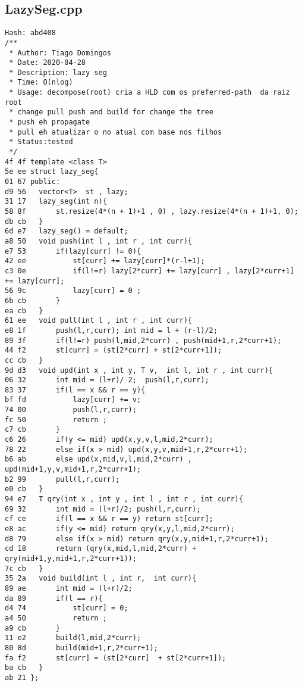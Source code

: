 \documentclass[11pt, a4paper, twoside]{article}
\begin{document}
\subsection{LazySeg.cpp}
\begin{lstlisting}
Hash: abd408
/**
 * Author: Tiago Domingos
 * Date: 2020-04-28
 * Description: lazy seg
 * Time: O(nlog) 
 * Usage: decompose(root) cria a HLD com os preferred-path  da raiz root
 * change pull push and build for change the tree 
 * push eh propagate
 * pull eh atualizar o no atual com base nos filhos
 * Status:tested 
 */
4f 4f template <class T> 
5e ee struct lazy_seg{
01 67 public:
d9 56 	vector<T>  st , lazy;
31 17 	lazy_seg(int n){
58 8f 		st.resize(4*(n + 1)+1 , 0) , lazy.resize(4*(n + 1)+1, 0);
db cb 	}
6d e7 	lazy_seg() = default;
a8 50 	void push(int l , int r , int curr){
e7 53 		if(lazy[curr] != 0){
42 ee 			st[curr] += lazy[curr]*(r-l+1);
c3 0e 			if(l!=r) lazy[2*curr] += lazy[curr] , lazy[2*curr+1] += lazy[curr];
56 9c 			lazy[curr] = 0 ;
6b cb 		}
ea cb 	}
61 ee 	void pull(int l , int r , int curr){
e8 1f 		push(l,r,curr); int mid = l + (r-l)/2;
89 3f 		if(l!=r) push(l,mid,2*curr) , push(mid+1,r,2*curr+1);
44 f2 		st[curr] = (st[2*curr] + st[2*curr+1]);
cc cb 	}
9d d3 	void upd(int x , int y, T v,  int l, int r , int curr){
06 32 		int mid = (l+r)/ 2;  push(l,r,curr);
83 37 		if(l == x && r == y){
bf fd 			lazy[curr] += v;
74 00 			push(l,r,curr);
fc 50 			return ;
c7 cb 		}
c6 26 		if(y <= mid) upd(x,y,v,l,mid,2*curr);
78 22 		else if(x > mid) upd(x,y,v,mid+1,r,2*curr+1);
b6 ab 		else upd(x,mid,v,l,mid,2*curr) , upd(mid+1,y,v,mid+1,r,2*curr+1);
b2 99 		pull(l,r,curr);
e0 cb 	}
94 e7 	T qry(int x , int y , int l , int r , int curr){
69 32 		int mid = (l+r)/2; push(l,r,curr);
cf ce 		if(l == x && r == y) return st[curr];
e8 ac 		if(y <= mid) return qry(x,y,l,mid,2*curr);
d8 79 		else if(x > mid) return qry(x,y,mid+1,r,2*curr+1);
cd 18 		return (qry(x,mid,l,mid,2*curr) + qry(mid+1,y,mid+1,r,2*curr+1));
7c cb 	}
35 2a 	void build(int l , int r,  int curr){
89 ae 		int mid = (l+r)/2;
da 89 		if(l == r){
d4 74 			st[curr] = 0; 
a4 50 			return ;
a9 cb 		}
11 e2 		build(l,mid,2*curr);
80 8d 		build(mid+1,r,2*curr+1);
fa f2 		st[curr] = (st[2*curr]  + st[2*curr+1]);
ba cb 	}
ab 21 };
\end{lstlisting}
\end{document}

